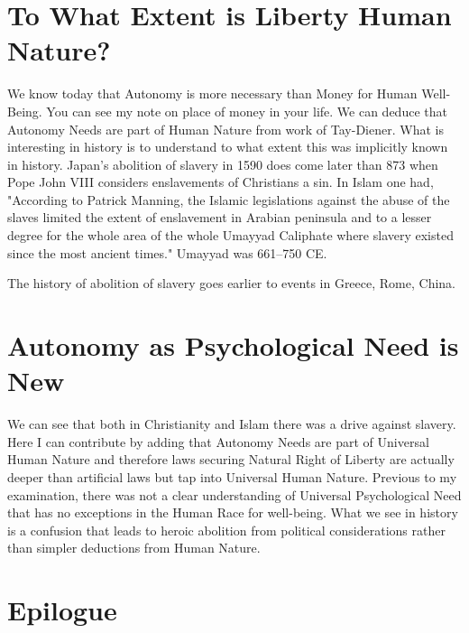 \documentclass{amsart}
\begin{document}
\section{To What Extent is Liberty Human Nature?}

We know today that Autonomy is more necessary than Money for Human Well-Being.  You can see my note on place of money in your life.  We can deduce that Autonomy Needs are part of Human Nature from work of Tay-Diener.  What is interesting in history is to understand to what extent this was implicitly known in history.  Japan's abolition of slavery in 1590 does come later than 873 when Pope John VIII considers enslavements of Christians a sin.  In Islam one had, "According to Patrick Manning, the Islamic legislations against the abuse of the slaves limited the extent of enslavement in Arabian peninsula and to a lesser degree for the whole area of the whole Umayyad Caliphate where slavery existed since the most ancient times."  Umayyad was 661–750 CE.

The history of abolition of slavery goes earlier to events in Greece, Rome, China.  

\section{Autonomy as Psychological Need is New}

We can see that both in Christianity and Islam there was a drive against slavery. Here I can contribute by adding that Autonomy Needs are part of Universal Human Nature and therefore laws securing Natural Right of Liberty are actually deeper than artificial laws but tap into Universal Human Nature.  Previous to my examination, there was not a clear understanding of Universal Psychological Need that has no exceptions in the Human Race for well-being.  What we see in history is a confusion that leads to heroic abolition from political considerations rather than simpler deductions from Human Nature.

\section{Epilogue}
\end{document}
